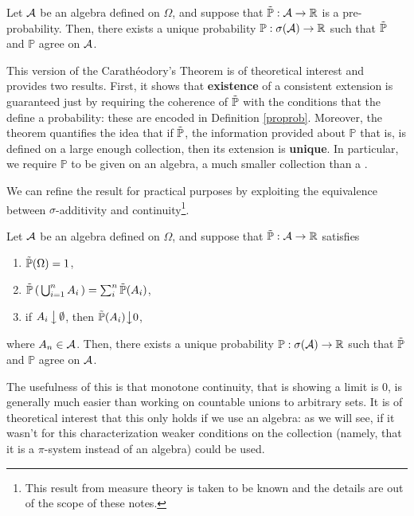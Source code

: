 \goodbreak\begin{my_theorem}
	\label{carathéorodory}
	Let $\mathcal{A}$ be an algebra defined on $\Omega$, and suppose that $\tilde{\mathbb{P}} : \mathcal{A} \to \mathbb{R}$ is a pre-probability.	Then, there exists a unique probability $\mathbb{P}: \sigma ( \mathcal{A} ) \to \mathbb{R}$ such that $\tilde{\mathbb{P}}$ and $\mathbb{P}$ agree on $\mathcal{A}$.
\end{my_theorem}
\begin{my_remark}
	This version of the Carathéodory's Theorem is of theoretical interest and provides two results.
	First, it shows that \textbf{existence} of a consistent extension is guaranteed just by requiring the coherence of $\tilde{\mathbb{P}}$ with the conditions that the define a probability: these are encoded in Definition \ref{proprob}.
	Moreover, the theorem quantifies the idea that if $\tilde{\mathbb{P}}$, the information provided about $\mathbb{P}$ that is, is defined on a large enough collection, then its extension is \textbf{unique}. 
	In particular, we require $\mathbb{P}$ to be given on an algebra, a much smaller collection than a \sigmaalg.
\end{my_remark}

We can refine the result for practical purposes by exploiting the equivalence between $\sigma$-additivity and continuity\footnote{This result from measure theory is taken to be known and the details are out of the scope of these notes.}.

\goodbreak\begin{my_lemma}
	Let $\mathcal{A}$ be an algebra defined on $\Omega$, and suppose that $\tilde{\mathbb{P}}:\mathcal{A}\to\mathbb{R}$ satisfies
	\begin{enumerate}
		\item $\tilde{\mathbb{P}}(\Omega)=1$,
		\item $\tilde{\mathbb{P}} \left( \, \bigcup^n_{i=1} A_i \, \right) = \sum^n_i \tilde{\mathbb{P}}(A_i)$,
		\item if $A_i \, \big \downarrow \, \emptyset$, then $\tilde{\mathbb{P}}(A_i) \big \downarrow0$,
	\end{enumerate}
	where $A_n\in\mathcal{A}$.
	Then, there exists a unique probability $\mathbb{P}: \sigma ( \mathcal{A} ) \to \mathbb{R}$ such that $\tilde{\mathbb{P}}$ and $\mathbb{P}$ agree on $\mathcal{A}$.
\end{my_lemma}
\begin{my_remark}
	The usefulness of this is that monotone continuity, that is showing a limit is $0$, is generally much easier than working on countable unions to arbitrary sets. 
	It is of theoretical interest that this only holds if we use an algebra: as we will see, if it wasn't for this characterization weaker conditions on the collection (namely, that it is a $\pi$-system instead of an algebra) could be used.
\end{my_remark}

